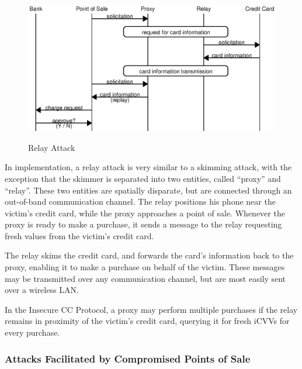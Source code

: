 \begin{figure}
  \caption{Relay Attack}
  \centering
    \includegraphics{img/attack-3-relay.eps}
  \label{fig:insecure-relay}
\end{figure}

In implementation, a relay attack is very similar to a skimming attack, with the exception that the skimmer is separated into two entities, called ``proxy'' and ``relay''.
These two entities are spatially disparate, but are connected through an out-of-band communication channel.
The relay positions his phone near the victim's credit card, while the proxy approaches a point of sale.
Whenever the proxy is ready to make a purchase, it sends a message to the relay requesting fresh values from the victim's credit card.

The relay skims the credit card, and forwards the card's information back to the proxy, enabling it to make a purchase on behalf of the victim.
These messages may be transmitted over any communication channel, but are most easily sent over a wireless LAN.

In the Insecure CC Protocol, a proxy may perform multiple purchases if the relay remains in proximity of the victim's credit card, querying it for fresh iCVVs for every purchase.





\subsubsection{Attacks Facilitated by Compromised Points of Sale}
\label{sec:insecure-compromised}

